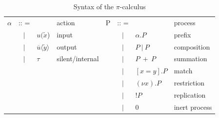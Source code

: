\begin{table}[h]
  \begin{center}
  \begin{tabular}{ l c l  l l c l  l }
$\alpha$&:: = &                                                                    	& action           &P & :: =  & & process \\
              & $|$ & $u(\widetilde{x}$)                                       	& input            &   & $|$  & $ \alpha.P$&prefix\\
              & $|$ & $\overline{u} \langle \widetilde{y} \rangle$	& output          &   & $|$ &$P\ |\ P$& composition\\
              & $|$ & $\tau$                                                         	& silent/internal & & $|$ &$P\ +\ P$& summation\\
                                                                                                                 &&&&& $|$ &$ [x = y].P $& match \\
                                                                                                                 &&&&& $|$ & $(\mathit{\nu}x).P$&restriction\\
                                                                                                                 &&&&& $|$ & $!P$ & replication\\
                                                                                                                 &&&&& $|$ & 0 & inert process\\                                                                                                                 
  \end{tabular}
  \end{center}
  \caption{Syntax of the $\pi$-calculus}
  \label{pi-syn}
\end{table}

